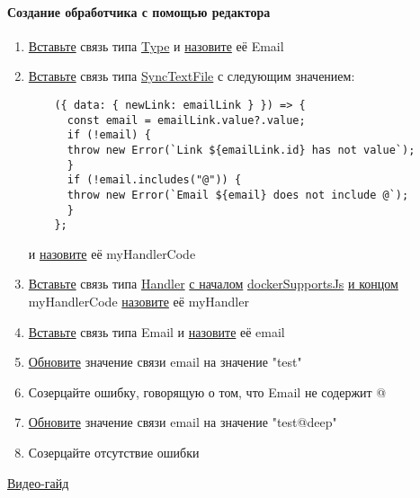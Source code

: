 \paragraph{Создание обработчика с помощью редактора}
\begin{enumerate}
      \item \hyperlink{DeepCase.InsertLink.Description}{Вставьте} связь типа
            \hyperlink{Core.Type.Description}{Type} и
            \hyperlink{FAQ.HowToSetName}{назовите} её Email
      \item \hyperlink{DeepCase.InsertLink.Description}{Вставьте} связь типа
            \hyperlink{Core.SyncTextFile.Description}{SyncTextFile} с следующим
            значением:
            \begin{lstlisting}
    ({ data: { newLink: emailLink } }) => {
      const email = emailLink.value?.value;
      if (!email) {
      throw new Error(`Link ${emailLink.id} has not value`);
      }
      if (!email.includes("@")) {
      throw new Error(`Email ${email} does not include @`);
      }
    };
                \end{lstlisting}
            и \hyperlink{FAQ.HowToSetName}{назовите} её myHandlerCode
      \item \hyperlink{DeepCase.InsertLink.Description}{Вставьте} связь типа
            \hyperlink{Core.Handler.Description}{Handler}
            \hyperlink{FAQ.HowToInsertLinkWithFromAndTo}{с началом}
            \hyperlink{Core.plv8SupportsJs.Description}{dockerSupportsJs}
            \hyperlink{FAQ.HowToInsertLinkWithFromAndTo}{и
              концом}
            myHandlerCode \hyperlink{FAQ.HowToSetName}{назовите} её myHandler
      \item \hyperlink{DeepCase.InsertLink.Description}{Вставьте} связь типа
            Email и \hyperlink{FAQ.HowToSetName}{назовите} её email
      \item \hyperlink{DeepCase.UpdateLink.Description}{Обновите} значение
            связи email на значение "test"
      \item Созерцайте ошибку, говорящую о том, что Email не содержит @
      \item \hyperlink{DeepCase.UpdateLink.Description}{Обновите} значение
            связи email на значение "test@deep"
      \item Созерцайте отсутствие ошибки
    \end{enumerate}
\href{https://youtu.be/fDgIqL0pzsg}{Видео-гайд}

